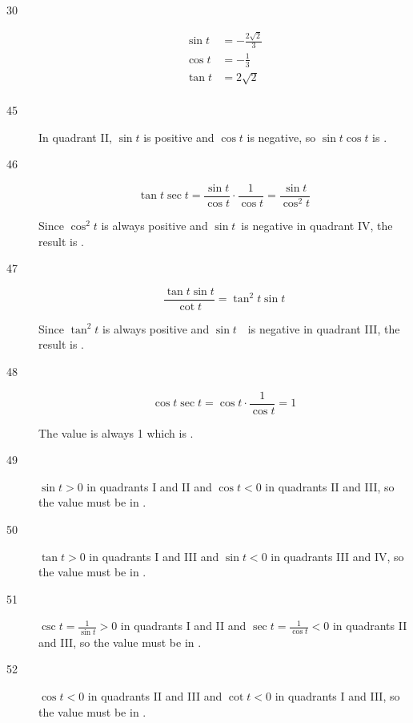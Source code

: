 \documentclass{exam}
\begin{document}
\begin{description}
      \item[30]
        \begin{align*}
          \sin t & = \boxed{ - \frac{2 \sqrt{2}}{3} } \\
          \cos t & = \boxed{ - \frac{1}{3} } \\
          \tan t & = \boxed{ 2 \sqrt{2} } \\
        \end{align*}

      \item[45]
        In quadrant II, $\sin t$ is positive and $\cos t$ is negative, so $\sin t \cos t$ is .

      \pagebreak

      \item[46]
        \[
          \tan t \sec t = \frac{\sin t}{\cos t} \cdot \frac{1}{\cos t} = \frac{\sin t}{\cos^2 t}
        \]

        Since $\cos^2 t$ is always positive and $\sin t$ is negative in quadrant IV, the result is .

      \item[47]
        \[
          \frac{\tan t \sin t}{\cot t} = \tan^2 t \sin t
        \]

        Since $\tan^2 t$ is always positive and $\sin t$ \ is negative in quadrant III, the result is .

      \item[48]
        \[
          \cos t \sec t = \cos t \cdot \frac{1}{\cos t} = 1
        \]

        The value is always 1 which is .

      \item[49] $\sin t > 0$ in quadrants I and II and $\cos t < 0$ in quadrants II and III, so the value must be in
        .

      \item[50] $\tan t > 0$ in quadrants I and III and $\sin t < 0$ in quadrants III and IV, so the value must be in
        .

      \item[51] $\csc t = \frac{1}{\sin t} > 0$ in quadrants I and II and $\sec t = \frac{1}{\cos t} < 0$ in quadrants
        II and III, so the value must be in .

      \item[52] $\cos t < 0$ in quadrants II and III and $\cot t < 0$ in quadrants I and III, so the value must be in
        .


\end{description}
\end{document}
